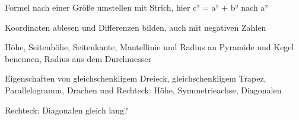 \begin{aufgabe}{Formel nach einer Größe umstellen mit Strich, hier c² = a² + b² nach a²}
\end{aufgabe}

\begin{aufgabe}{Koordinaten ablesen und Differenzen bilden, auch mit negativen Zahlen}
\end{aufgabe}

\begin{aufgabe}{Höhe, Seitenhöhe, Seitenkante, Mantellinie und Radius an Pyramide und Kegel benennen, Radius aus dem Durchmesser}
\end{aufgabe}

\begin{aufgabe}{Eigenschaften von gleichschenkligem Dreieck, gleichschenkligem Trapez, Parallelogramm, Drachen und Rechteck: Höhe, Symmetrieachse, Diagonalen}
\begin{teile}
\teil Rechteck: Diagonalen gleich lang? \janein
\end{teile}
\end{aufgabe}

